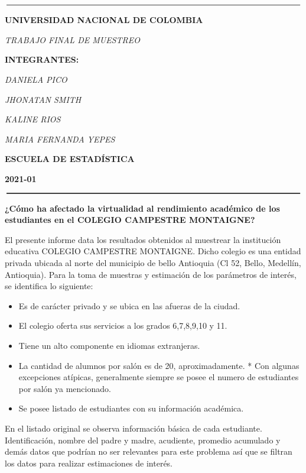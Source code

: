\documentclass[
]{article}
\author{}
\date{\vspace{-2.5em}}
\begin{document}
\(\rule{6.5in}{1pt}\)

\begin{center}

\textbf{UNIVERSIDAD NACIONAL DE COLOMBIA}

\textit{TRABAJO FINAL DE MUESTREO}

\textbf{INTEGRANTES:}

\textit{DANIELA PICO}

\textit{JHONATAN SMITH}

\textit{KALINE RIOS}

\textit{MARIA FERNANDA YEPES}

\textbf{ESCUELA DE ESTADÍSTICA}

\textbf{2021-01}
\end{center}

\(\rule{6.5in}{1pt}\)

\begin{center}

\textbf{¿Cómo ha afectado la virtualidad al rendimiento académico de los estudiantes en el COLEGIO CAMPESTRE MONTAIGNE?}
\end{center}

El presente informe data los resultados obtenidos al muestrear la
institución educativa COLEGIO CAMPESTRE MONTAIGNE. Dicho colegio es una
entidad privada ubicada al norte del municipio de bello Antioquia (Cl
52, Bello, Medellín, Antioquia). Para la toma de muestras y estimación
de los parámetros de interés, se identifica lo siguiente:

\begin{itemize}
\item
  Es de carácter privado y se ubica en las afueras de la ciudad.
\item
  El colegio oferta sus servicios a los grados 6,7,8,9,10 y 11.
\item
  Tiene un alto componente en idiomas extranjeras.
\item
  La cantidad de alumnos por salón es de 20, aproximadamente. * Con
  algunas excepciones atípicas, generalmente siempre se posee el numero
  de estudiantes por salón ya mencionado.
\item
  Se posee listado de estudiantes con su información académica.
\end{itemize}

En el listado original se observa información básica de cada estudiante.
Identificación, nombre del padre y madre, acudiente, promedio acumulado
y demás datos que podrían no ser relevantes para este problema así que
se filtran los datos para realizar estimaciones de interés.
\end{document}
